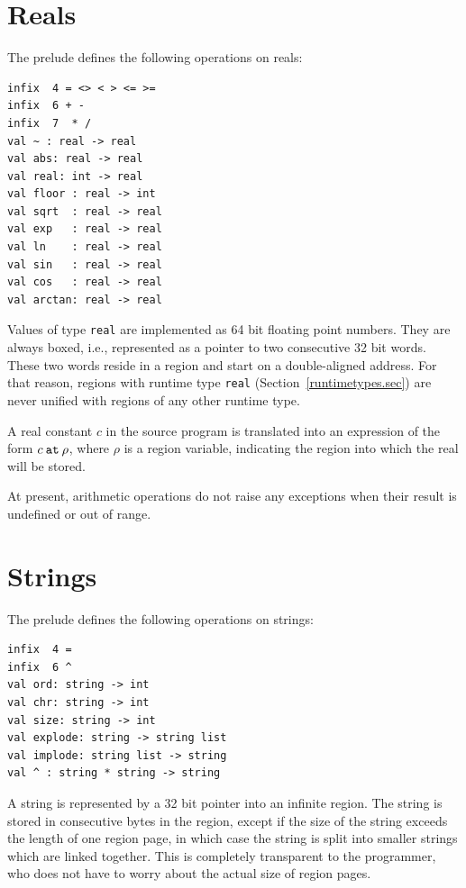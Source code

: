\documentclass[12pt]{book}
\begin{document}
\section{Reals}
The prelude defines the following operations on reals:
\index{{\tt =}}\index{{\tt <>}}\index{{\tt <}}\index{{\tt >}}\index{{\tt <=}}\index{{\tt >=}}\index{{\tt +}}\index{{\tt -}}\index{{\tt *}}\index{{\tt /}}\index{\verb+~+}
\begin{verbatim}
infix  4 = <> < > <= >= 
infix  6 + - 
infix  7  * /
val ~ : real -> real
val abs: real -> real
val real: int -> real
val floor : real -> int
val sqrt  : real -> real
val exp   : real -> real
val ln    : real -> real
val sin   : real -> real
val cos   : real -> real
val arctan: real -> real
\end{verbatim}
Values of type {\tt real} are implemented as 64 bit floating point numbers. 
They are always boxed, i.e., represented as a pointer to two consecutive 32 bit words.
These two words reside in a region and start on a double-aligned address. For that reason,
regions with runtime type {\tt real} (Section~\ref{runtimetypes.sec}) are never unified with regions of any
other runtime type.

A real constant $c$ in the source program is translated
into an expression of the form $c\mathbin{\hbox{\tt at}}\rho$, where $\rho$ is a
region variable, indicating the region into which the real will be
stored.  

At present, arithmetic operations do not raise any exceptions when their
result is undefined or out of range.
\section{Strings}
The prelude defines the following operations on strings:\index{{\tt =}}\index{\verb+^+}
\begin{verbatim}
infix  4 = 
infix  6 ^
val ord: string -> int
val chr: string -> int
val size: string -> int
val explode: string -> string list
val implode: string list -> string
val ^ : string * string -> string
\end{verbatim}
A string is represented by a 32 bit pointer into an infinite region. 
The string is stored in consecutive bytes in the region, except if the size of
the string exceeds the length of one region page, in which case the string is split
into smaller strings which are linked together. This is completely transparent
to the programmer, who does not have to worry about the actual size of
region pages.
\end{document}
